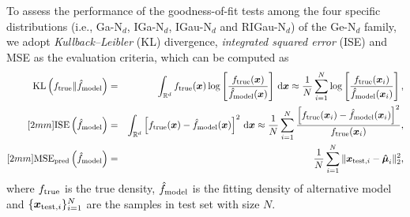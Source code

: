 To assess the performance of the goodness-of-fit tests among the four specific distributions (i.e., Ga-N$_d$, IGa-N$_d$, IGau-N$_d$ and RIGau-N$_d$) of the Ge-N$_d$ family, we adopt \textit{Kullback--Leibler} (KL) divergence, \textit{integrated squared error} (ISE) and MSE as the evaluation criteria, which can be computed as
\begin{eqnarray*}
    \mbox{KL}\left( f_{\rm true} \| \hat{f}_{\rm model} \right) &=& \int_{{\mathbb{R}}^d} f_{\rm true}({\boldsymbol{x}}) \log \left[\frac{f_{\rm true}({\boldsymbol{x}})}{\hat{f}_{\rm model}({\boldsymbol{x}})}\right] \,\mbox{d} {\boldsymbol{x}} \approx \frac{1}{N} \sum_{i=1}^N \log \left[\frac{f_{\rm true}({\boldsymbol{x}}_i)}{\hat{f}_{\rm model}({\boldsymbol{x}}_i)}\right], \\ [2mm]
    \mbox{ISE}\left(\hat{f}_{\rm model}\right) &=& \int_{{\mathbb{R}}^d} \left[ f_{\rm true}({\boldsymbol{x}}) - \hat{f}_{\rm model}({\boldsymbol{x}}) \right]^2 \,\mbox{d} {\boldsymbol{x}} \approx \frac{1}{N} \sum_{i=1}^N \frac{ \left[ f_{\rm true}({\boldsymbol{x}}_i) - \hat{f}_{\rm model}({\boldsymbol{x}}_i) \right]^2}{f_{\rm true}({\boldsymbol{x}}_i)}, \\ [2mm]
    \mbox{MSE}_{\rm pred}\left(\hat{f}_{\rm model}\right) &=& \frac{1}{N} \sum_{i=1}^N \|{\boldsymbol{x}}_{{\rm test}, i} - \boldsymbol{\hat{\mu}}_i\|_2^2,
\end{eqnarray*}
where $f_{\rm true}$ is the true density, $\hat{f}_{\rm model}$ is the fitting density of alternative model and $\{{\boldsymbol{x}}_{{\rm test}, i}\}_{i=1}^N$ are the samples in test set with size $N$.

